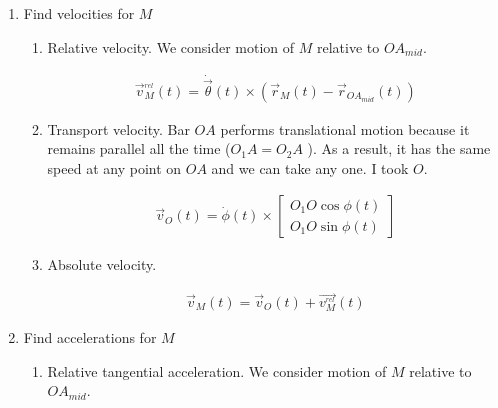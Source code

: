 \begin{enumerate}
    \item Find velocities for $M$
          \begin{enumerate}
              \item Relative velocity. We consider motion of $M$ relative to $OA_{mid}$.
                    \begin{answer}
                        \begin{align}
                            \vec{v}^{_{rel}}_{M}(t) =  \dot{\vec{\theta}}(t) \times (\vec{r}_{M}(t) - \vec{r}_{OA_{mid}}(t))
                        \end{align}
                    \end{answer}
              \item Transport velocity. Bar $OA$ performs translational motion
                    because it remains parallel all the time ($O_1A = O_2A$ ). As a result,
                    it has the same speed at any point on $OA$ and we can take any one. I took $O$.
                    \begin{answer}
                        \begin{align}
                            \vec{v}_{O}(t) = \dot{\phi}(t) \times \begin{bmatrix}
                                O_1O \cos{\phi(t)} \\
                                O_1O \sin{\phi(t)}
                            \end{bmatrix}
                        \end{align}
                    \end{answer}
              \item Absolute velocity.
                    \begin{answer}
                        \begin{align}
                            \vec{v}_{M}(t) = \vec{v}_{O}(t) + \vec{v^{_{rel}}_{M}}(t)
                        \end{align}
                    \end{answer}
          \end{enumerate}
    \item Find accelerations for $M$
          \begin{enumerate}
              \item Relative tangential acceleration. We consider motion of $M$ relative to $OA_{mid}$.
                    \begin{answer}
                        \begin{align}

\end{align}
\end{answer}
\end{enumerate}
\end{enumerate}
